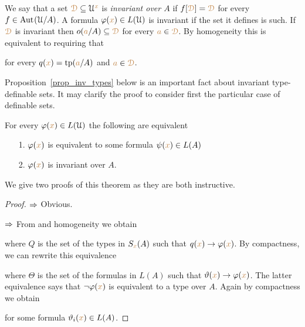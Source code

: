 We say that a set ${\color{brown}\EuScript D}\subseteq\EuScript U^{{\color{brown} x}}$ is \emph{invariant over $A$\/} if $f[{\color{brown}\EuScript D}]={\color{brown}\EuScript D}$ for every $f\in{\rm Aut\kern.15ex}(\EuScript U/A)$.
A formula $\varphi({\color{brown} x})\in L(\EuScript U)$ is invariant if the set it defines is such.   
If ${\color{brown}\EuScript D}$ is invariant then $o({\color{brown} a}/A)\subseteq {\color{brown}\EuScript D}$ for every ${\color{brown} a}\in {\color{brown}\EuScript D}$.
By homogeneity this is equivalent to requiring that 


for every $q({\color{brown} x})={\rm tp}({\color{brown} a}/A)$ and ${\color{brown} a}\in {\color{brown}\EuScript D}$.

Proposition~\ref{prop_inv_types} below is an important fact about invariant type-definable sets.
It may clarify the proof to consider first the particular case of definable sets.

\begin{proposition}\label{prop_inv_def}
For every $\varphi({\color{brown} x})\in L(\EuScript U)$ the following are equivalent
\begin{itemize}
 \item[1.] $\varphi({\color{brown} x})$ is equivalent to some formula $\psi({\color{brown} x})\in L(A)$
 \item[2.] $\varphi({\color{brown} x})$ is invariant over $A$.
\end{itemize}
\end{proposition}

We give two proofs of this theorem as they are both instructive.

\vspace*{-\parskip}
\begin{proof}
$\Rightarrow$ Obvious.

$\Rightarrow$ From  and homogeneity we obtain


where $Q$ is the set of the types in $S_{\color{brown} x}(A)$ such that $q({\color{brown} x})\rightarrow\varphi({\color{brown} x})$. 
By compactness, we can rewrite this equivalence 


where $\Theta$ is the set of the formulas in $L(A)$ such that $\vartheta({\color{brown} x})\rightarrow\varphi({\color{brown} x})$.
The latter equivalence says that $\neg\varphi({\color{brown} x})$ is equivalent to a type over $A$. 
Again by compactness we obtain 


for some formula $\vartheta_i({\color{brown} x})\in L(A)$.
\end{proof}

